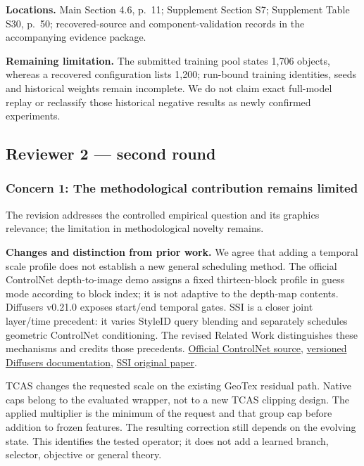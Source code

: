\documentclass[
  10pt,
]{article}
\begin{document}
\textbf{Locations.} Main Section 4.6, p.~11; Supplement Section S7;
Supplement Table S30, p.~50; recovered-source and component-validation
records in the accompanying evidence package.

\textbf{Remaining limitation.} The submitted training pool states 1,706
objects, whereas a recovered configuration lists 1,200; run-bound
training identities, seeds and historical weights remain incomplete. We
do not claim exact full-model replay or reclassify those historical
negative results as newly confirmed experiments.

\hypertarget{reviewer-2-second-round}{%
\subsection{Reviewer 2 --- second round}\label{reviewer-2-second-round}}

\hypertarget{concern-1-the-methodological-contribution-remains-limited}{%
\subsubsection{Concern 1: The methodological contribution remains
limited}\label{concern-1-the-methodological-contribution-remains-limited}}

The revision addresses the controlled empirical question and its
graphics relevance; the limitation in methodological novelty remains.

\textbf{Changes and distinction from prior work.} We agree that adding a
temporal scale profile does not establish a new general scheduling
method. The official ControlNet depth-to-image demo assigns a fixed
thirteen-block profile in guess mode according to block index; it is not
adaptive to the depth-map contents. Diffusers v0.21.0 exposes start/end
temporal gates. SSI is a closer joint layer/time precedent: it varies
StyleID query blending and separately schedules geometric ControlNet
conditioning. The revised Related Work distinguishes these mechanisms
and credits those precedents.
\href{https://github.com/lllyasviel/ControlNet/blob/f2e1bc38dc8d925fb542be4c138c46013ace1988/gradio_depth2image.py\#L49}{Official
ControlNet source},
\href{https://huggingface.co/docs/diffusers/v0.21.0/api/pipelines/controlnet}{versioned
Diffusers documentation}, \href{https://arxiv.org/html/2605.26538}{SSI
original paper}.

TCAS changes the requested scale on the existing GeoTex residual path.
Native caps belong to the evaluated wrapper, not to a new TCAS clipping
design. The applied multiplier is the minimum of the request and that
group cap before addition to frozen features. The resulting correction
still depends on the evolving state. This identifies the tested
operator; it does not add a learned branch, selector, objective or
general theory.
\end{document}
